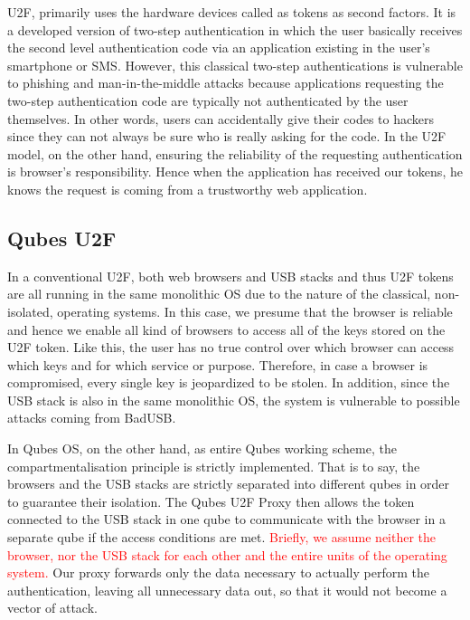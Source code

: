 \documentclass[runningheads,a4paper]{article}
\begin{document}
U2F, primarily uses the hardware devices called as tokens as second
factors. It is a developed version of two-step authentication in which
the user basically receives the second level authentication code via
an application existing in the user's smartphone or SMS. However, this
classical two-step authentications is vulnerable to phishing and
man-in-the-middle attacks because applications requesting the two-step
authentication code are typically not authenticated by the
user themselves. In other words, users can accidentally give their codes to
hackers since they can not always be sure who is really asking for the
code. In the U2F model, on the other hand, ensuring the reliability of
the requesting authentication is browser's responsibility. Hence
when the application has received our tokens, he knows the request is
coming from a trustworthy web application.

\subsection{Qubes U2F} 

In a conventional U2F, both web browsers and
USB stacks and thus U2F tokens are all running in the same monolithic
OS due to the nature of the classical, non-isolated, operating
systems. In this case, we presume that the browser is reliable and
hence we enable all kind of browsers to access all of the keys stored
on the U2F token. Like this, the user has no true control over which
browser can access which keys and for which service or
purpose. Therefore, in case a browser is compromised, every single key
is jeopardized to be stolen. In addition, since the USB stack is also
in the same monolithic OS, the system is vulnerable to possible
attacks coming from BadUSB.

In Qubes OS, on the other hand, as entire Qubes working scheme, the
compartmentalisation principle is strictly implemented. That is to
say, the browsers and the USB stacks are strictly separated into
different qubes in order to guarantee their isolation.  The Qubes U2F
Proxy then allows the token connected to the USB stack in one qube to
communicate with the browser in a separate qube if the access
conditions are met. \textcolor{red}{Briefly, we assume neither the browser, nor the USB
stack for each other and the entire units of the operating system.} Our
proxy forwards only the data necessary to actually perform the
authentication, leaving all unnecessary data out, so that it would not
become a vector of attack.
\end{document}
